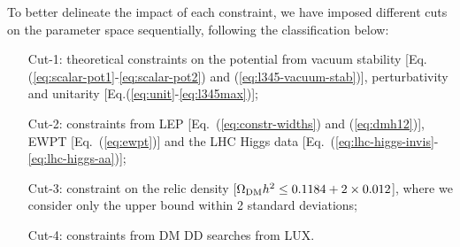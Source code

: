 \documentclass[12pt,a4paper]{article}
\begin{document}


To better delineate the impact of each constraint, we have imposed different cuts on the parameter space sequentially, 
following the classification below:
\begin{itemize}
\item[Cut-1:] theoretical constraints on the potential from vacuum stability 
[Eq.(\ref{eq:scalar-pot1}-\ref{eq:scalar-pot2}) and (\ref{eq:l345-vacuum-stab})], perturbativity  and
unitarity [Eq.(\ref{eq:unit}-\ref{eq:l345max})];
\item[Cut-2:] constraints from LEP [Eq.~(\ref{eq:constr-widths}) and (\ref{eq:dmh12})], EWPT
[Eq.~(\ref{eq:ewpt})] and the LHC Higgs data
[Eq.~(\ref{eq:lhc-higgs-invis}-\ref{eq:lhc-higgs-aa})];
\item[Cut-3:] constraint on the relic
density  [$\Omega_{\rm DM} h^2 \le 0.1184+2\times 0.012$], where we consider only the upper bound within 2 standard deviations;
\item[Cut-4:] constraints from DM DD searches from LUX.
\end{itemize}
\end{document}
